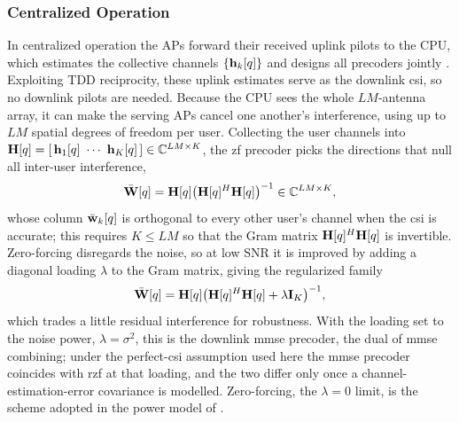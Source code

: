 \subsubsection{Centralized Operation}
\label{sssec:centralized}

In centralized operation the APs forward their received uplink pilots to the CPU,
which estimates the collective channels $\{\boldsymbol{\mathrm{h}}_{k}[q]\}$ and designs all
precoders jointly \cite{demir2021foundations}. Exploiting TDD reciprocity, these
uplink estimates serve as the downlink \gls{csi}, so no downlink pilots are
needed. Because the CPU sees the whole $LM$-antenna array, it can make the
serving APs cancel one another's interference, using up to $LM$ spatial degrees
of freedom per user. Collecting the user channels into
$\mat{H}[q]=[\,\vect{h}_{1}[q]\ \cdots\ \vect{h}_{K}[q]\,]\inC{LM\times K}$, the
\gls{zf} precoder picks the directions that null all inter-user interference,
\begin{equation}
\label{eq:zf-precoder}
\bar{\boldsymbol{\mathrm{W}}}[q] = \boldsymbol{\mathrm{H}}[q]\big(\boldsymbol{\mathrm{H}}[q]^{H}\boldsymbol{\mathrm{H}}[q]\big)^{-1}
\in\mathbb{C}^{LM\times K},
\end{equation}
whose column $\bar{\boldsymbol{\mathrm{w}}}_{k}[q]$ is orthogonal to every other user's channel
when the \gls{csi} is accurate; this requires $K\leq LM$ so that the Gram matrix
$\boldsymbol{\mathrm{H}}[q]^{H}\boldsymbol{\mathrm{H}}[q]$ is invertible. Zero-forcing disregards the noise, so
at low SNR it is improved by adding a diagonal loading $\lambda$ to the Gram
matrix, giving the regularized family
\begin{equation}
\label{eq:centralized-rzf}
\bar{\boldsymbol{\mathrm{W}}}[q] = \boldsymbol{\mathrm{H}}[q]\big(\boldsymbol{\mathrm{H}}[q]^{H}\boldsymbol{\mathrm{H}}[q]+\lambda\boldsymbol{\mathrm{I}}_{K}\big)^{-1},
\end{equation}
which trades a little residual interference for robustness. With the loading set
to the noise power, $\lambda=\sigma^{2}$, this is the downlink \gls{mmse}
precoder, the dual of \gls{mmse} combining; under the perfect-\gls{csi}
assumption used here the \gls{mmse} precoder coincides with \gls{rzf} at that
loading, and the two differ only once a channel-estimation-error covariance is
modelled. Zero-forcing, the $\lambda=0$ limit, is the scheme adopted in the power
model of .

